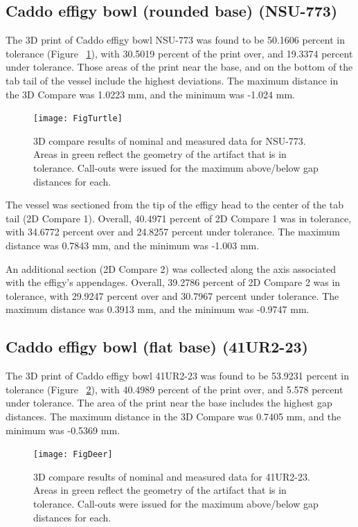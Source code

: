 \documentclass[review]{elsarticle}
\begin{document}
\subsection*{Caddo effigy bowl (rounded base) (NSU-773)}

The 3D print of Caddo effigy bowl NSU-773 was found to be 50.1606 percent in tolerance (Figure ~\ref{fig:FigTurtle}), with 30.5019 percent of the print over, and 19.3374 percent under tolerance. Those areas of the print near the base, and on the bottom of the tab tail of the vessel include the highest deviations. The maximum distance in the 3D Compare was 1.0223 mm, and the minimum was -1.024 mm. 

\begin{figure}[ht]\centering
\texttt{[image: FigTurtle]}
\caption{3D compare results of nominal and measured data for NSU-773. Areas in green reflect the geometry of the artifact that is in tolerance. Call-outs were issued for the maximum above/below gap distances for each.}
\label{fig:FigTurtle}
\end{figure}

The vessel was sectioned from the tip of the effigy head to the center of the tab tail (2D Compare 1). Overall, 40.4971 percent of 2D Compare 1 was in tolerance, with 34.6772 percent over and 24.8257 percent under tolerance. The maximum distance was 0.7843 mm, and the minimum was -1.003 mm.

An additional section (2D Compare 2) was collected along the axis associated with the effigy's appendages. Overall, 39.2786 percent of 2D Compare 2 was in tolerance, with 29.9247 percent over and 30.7967 percent under tolerance. The maximum distance was 0.3913 mm, and the minimum was -0.9747 mm.

\subsection*{Caddo effigy bowl (flat base) (41UR2-23)}

The 3D print of Caddo effigy bowl 41UR2-23 was found to be 53.9231 percent in tolerance (Figure ~\ref{fig:FigDeer}), with 40.4989 percent of the print over, and 5.578 percent under tolerance. The area of the print near the base includes the highest gap distances. The maximum distance in the 3D Compare was 0.7405 mm, and the minimum was -0.5369 mm.

\begin{figure}[ht]\centering
\texttt{[image: FigDeer]}
\caption{3D compare results of nominal and measured data for 41UR2-23. Areas in green reflect the geometry of the artifact that is in tolerance. Call-outs were issued for the maximum above/below gap distances for each.}
\label{fig:FigDeer}
\end{figure}
\end{document}
